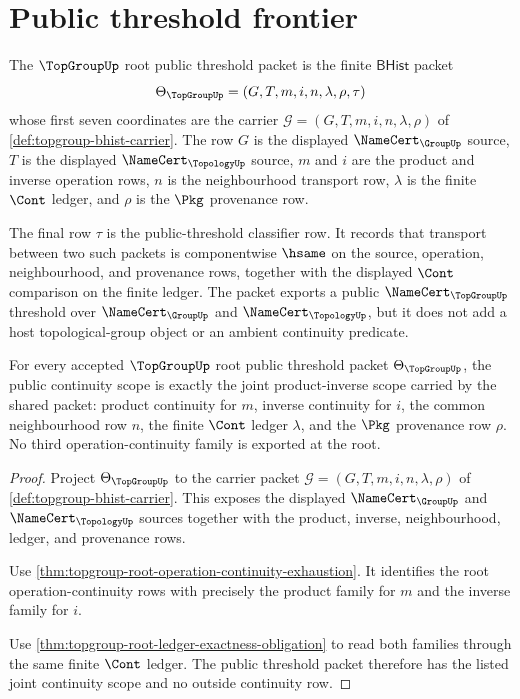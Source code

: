 \section{Public threshold frontier}
\label{sec:topgroup-public-threshold-frontier}

\begin{definition}
\label{def:topgroup-root-public-threshold-packet}
The $\TopGroupUp$ root public threshold packet is the finite
$\mathsf{BHist}$ packet
$$
\Theta_{\TopGroupUp}=(G,T,m,i,n,\lambda,\rho,\tau)
$$
whose first seven coordinates are the carrier
$\mathcal G=(G,T,m,i,n,\lambda,\rho)$ of
\autoref{def:topgroup-bhist-carrier}. The row $G$ is the displayed
$\NameCert_{\GroupUp}$ source, $T$ is the displayed
$\NameCert_{\TopologyUp}$ source, $m$ and $i$ are the product and inverse
operation rows, $n$ is the neighbourhood transport row, $\lambda$ is the
finite $\Cont$ ledger, and $\rho$ is the $\Pkg$ provenance row.

The final row $\tau$ is the public-threshold classifier row. It records that
transport between two such packets is componentwise $\hsame$ on the source,
operation, neighbourhood, and provenance rows, together with the displayed
$\Cont$ comparison on the finite ledger. The packet exports a public
$\NameCert_{\TopGroupUp}$ threshold over $\NameCert_{\GroupUp}$ and
$\NameCert_{\TopologyUp}$, but it does not add a host topological-group
object or an ambient continuity predicate.
\end{definition}

\begin{theorem}
\label{thm:topgroup-root-product-inverse-joint-continuity-scope}
For every accepted $\TopGroupUp$ root public threshold packet
$\Theta_{\TopGroupUp}$, the public continuity scope is exactly the joint
product-inverse scope carried by the shared packet: product continuity for
$m$, inverse continuity for $i$, the common neighbourhood row $n$, the finite
$\Cont$ ledger $\lambda$, and the $\Pkg$ provenance row $\rho$. No third
operation-continuity family is exported at the root.
\end{theorem}
\begin{proof}
Project $\Theta_{\TopGroupUp}$ to the carrier packet
$\mathcal G=(G,T,m,i,n,\lambda,\rho)$ of
\autoref{def:topgroup-bhist-carrier}. This exposes the displayed
$\NameCert_{\GroupUp}$ and $\NameCert_{\TopologyUp}$ sources together with
the product, inverse, neighbourhood, ledger, and provenance rows.

Use \autoref{thm:topgroup-root-operation-continuity-exhaustion}. It identifies
the root operation-continuity rows with precisely the product family for $m$
and the inverse family for $i$.

Use \autoref{thm:topgroup-root-ledger-exactness-obligation} to read both
families through the same finite $\Cont$ ledger. The public threshold packet
therefore has the listed joint continuity scope and no outside continuity
row.
\end{proof}


